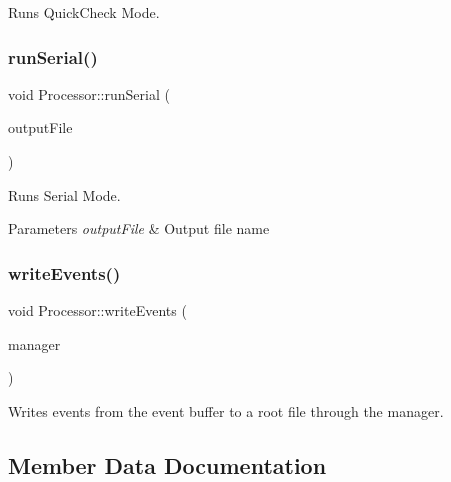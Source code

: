 Runs Quick\+Check Mode. 

\mbox{\label{class_processor_adf50ef4f51094892e979ebd7cd15af04}} 
\subsubsection{\texorpdfstring{run\+Serial()}{runSerial()}}
{\footnotesize\ttfamily void Processor\+::run\+Serial (\begin{DoxyParamCaption}\item[{const std\+::string}]{output\+File }\end{DoxyParamCaption})\hspace{0.3cm}{\ttfamily [private]}}



Runs Serial Mode. 


\begin{DoxyParams}{Parameters}
{\em output\+File} & Output file name \\
\hline
\end{DoxyParams}
\mbox{\label{class_processor_a1a19cb73f339992d6dd1be580c8efef0}} 
\subsubsection{\texorpdfstring{write\+Events()}{writeEvents()}}
{\footnotesize\ttfamily void Processor\+::write\+Events (\begin{DoxyParamCaption}\item[{std\+::unique\+\_\+ptr$<$ \hyperlink{class_event_tree_manager}{Event\+Tree\+Manager} $>$ \&}]{manager }\end{DoxyParamCaption})\hspace{0.3cm}{\ttfamily [private]}}



Writes events from the event buffer to a root file through the manager. 



\subsection{Member Data Documentation}
\mbox{\label{class_processor_ae6ebab331300f556a5c9b58d3dbfff60}} 
